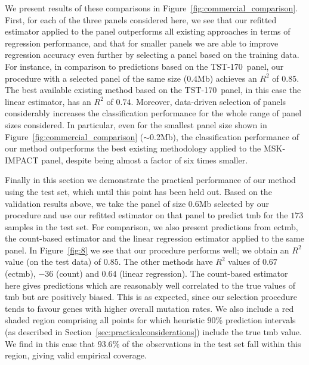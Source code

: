 \documentclass[../thesis.tex]{subfiles}
\begin{document}
We present results of these comparisons in  Figure~\ref{fig:commercial_comparison}. First, for each of the three panels considered here, we see that our refitted estimator applied to the panel outperforms all existing approaches in terms of regression performance, and that for smaller panels we are able to improve regression accuracy even further by selecting a panel based on the training data. For instance, in comparison to predictions based on the TST-170~panel, our procedure with a selected panel of the same size ($0.4$Mb) achieves an $R^2$ of $0.85$. The best available existing method based on the TST-170~panel, in this case the linear estimator, has an $R^2$ of $0.74$. Moreover, data-driven selection of panels considerably increases the classification performance for the whole range of panel sizes considered. In particular, even for the smallest panel size shown in Figure~\ref{fig:commercial_comparison} ($\sim$0.2Mb), the classification performance of our method outperforms the best existing methodology applied to the MSK-IMPACT panel, despite being almost a factor of six times smaller.  

Finally in this section we demonstrate the practical performance of our method using the test set, which until this point has been held out. Based on the validation results above, we take the panel of size 0.6Mb selected by our procedure and use our refitted estimator on that panel to predict \gls{tmb} for the $173$  samples in the test set. For comparison, we also present predictions from \gls{ectmb}, the count-based estimator and the linear regression estimator applied to the same panel.  In Figure~\ref{fig:8} we see that our procedure performs well; we obtain an $R^2$ value (on the test data) of $0.85$.  The other methods have $R^2$ values of $0.67$ (\gls{ectmb}), $-36$ (count) and $0.64$ (linear regression). The count-based estimator here gives predictions which are reasonably well correlated to the true values of \gls{tmb} but are positively biased. This is as expected, since our selection procedure tends to favour genes with higher overall mutation rates.  We also include a red shaded region comprising all points for which heuristic 90\% prediction intervals (as described in Section~\ref{sec:practicalconsiderations}) include the true \gls{tmb} value. We find in this case that $93.6$\% of the observations in the test set fall within this region, giving valid empirical coverage.
\end{document}
